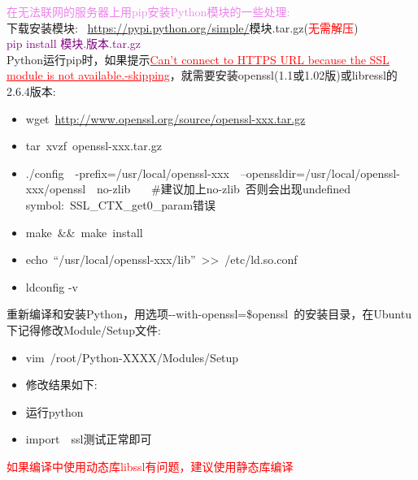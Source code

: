 \documentclass[10pt,a4paper]{article}
\begin{document}
\textcolor{violet}{在无法联网的服务器上用\textrm{pip}安装\textrm{Python}模块的一些处理:}\\
下载安装模块:~ \textrm{\url{https://pypi.python.org/simple/}}模块.tar.gz\:\:\:(\textcolor{red}{无需解压})\\
\textcolor{purple}{pip install 模块.版本.tar.gz}\\


\textrm{Python}运行\textrm{pip}时，如果提示\textcolor{red}{\underline{\textrm{Can't connect to HTTPS URL because the SSL module is not available.-skipping}}}，就需要安装\textrm{openssl}(1.1或1.02版)或\textrm{libressl}的2.6.4版本:
\begin{itemize}
	\item \textrm{wget~\url{http://www.openssl.org/source/openssl-xxx.tar.gz}}
	\item \textrm{tar~xvzf~openssl-xxx.tar.gz}
	\item \textrm{./config~~-prefix=/usr/local/openssl-xxx~~--openssldir=/usr/local/openssl-xxx/openssl~~no-zlib} ~~~\#建议加上\textrm{no-zlib}~否则会出现\textrm{undefined symbol:~SSL\_CTX\_get0\_param}错误
	\item \textrm{make~\&\&~make~install}
	\item \textrm{echo~``/usr/local/openssl-xxx/lib''~>>~/etc/ld.so.conf}
	\item \textrm{ldconfig -v}
\end{itemize}
重新编译和安装\textrm{Python}，用选项\textrm{-\/-with-openssl=\$openssl~}的安装目录，在\textrm{Ubuntu}下记得修改\textrm{Module/Setup}文件:~
\begin{itemize}
	\item \textrm{vim~/root/Python-XXXX/Modules/Setup}
	\item 修改结果如下:\\
    \item 运行\textrm{python}
    \item \textrm{import~~ssl}测试正常即可
\end{itemize}
\textcolor{red}{如果编译中使用动态库\textrm{libssl}有问题，建议使用静态库编译}
\end{document}
